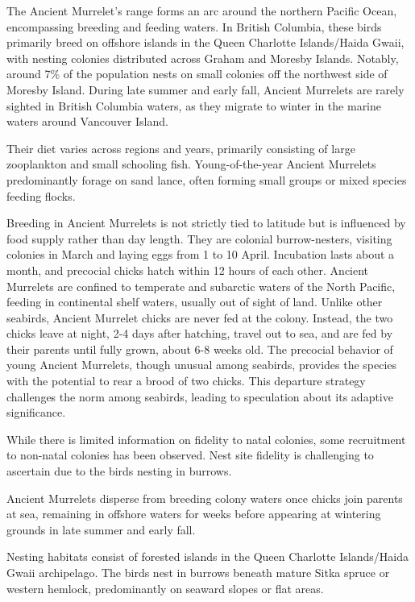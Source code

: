 \documentclass{article}
\begin{document}
The Ancient Murrelet's range forms an arc around the northern Pacific Ocean, encompassing breeding and feeding waters. In British Columbia, these birds primarily breed on offshore islands in the Queen Charlotte Islands/Haida Gwaii, with nesting colonies distributed across Graham and Moresby Islands. Notably, around 7\% of the population nests on small colonies off the northwest side of Moresby Island. During late summer and early fall, Ancient Murrelets are rarely sighted in British Columbia waters, as they migrate to winter in the marine waters around Vancouver Island.\cite{gaston1990population}

Their diet varies across regions and years, primarily consisting of large zooplankton and small schooling fish. Young-of-the-year Ancient Murrelets predominantly forage on sand lance, often forming small groups or mixed species feeding flocks.\cite{bc_ancient_murrelet}

Breeding in Ancient Murrelets is not strictly tied to latitude but is influenced by food supply rather than day length. They are colonial burrow-nesters, visiting colonies in March and laying eggs from 1 to 10 April. Incubation lasts about a month, and precocial chicks hatch within 12 hours of each other. Ancient Murrelets are confined to temperate and subarctic waters of the North Pacific, feeding in continental shelf waters, usually out of sight of land. Unlike other seabirds, Ancient Murrelet chicks are never fed at the colony. Instead, the two chicks leave at night, 2-4 days after hatching, travel out to sea, and are fed by their parents until fully grown, about 6-8 weeks old. The precocial behavior of young Ancient Murrelets, though unusual among seabirds, provides the species with the potential to rear a brood of two chicks. This departure strategy challenges the norm among seabirds, leading to speculation about its adaptive significance.\cite{bc_ancient_murrelet}\cite{gaston1990population}


While there is limited information on fidelity to natal colonies, some recruitment to non-natal colonies has been observed. Nest site fidelity is challenging to ascertain due to the birds nesting in burrows.\cite{gaston1990population}


Ancient Murrelets disperse from breeding colony waters once chicks join parents at sea, remaining in offshore waters for weeks before appearing at wintering grounds in late summer and early fall.

Nesting habitats consist of forested islands in the Queen Charlotte Islands/Haida Gwaii archipelago. The birds nest in burrows beneath mature Sitka spruce or western hemlock, predominantly on seaward slopes or flat areas.
\end{document}
